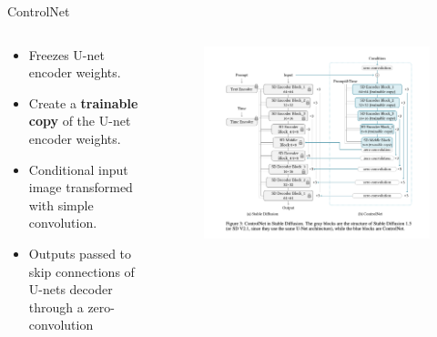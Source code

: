 \documentclass[8pt]{beamer}
\begin{document}
\begin{frame}{ControlNet}
    \begin{columns}
        \begin{column}{0.5\textwidth}
            \begin{itemize}
               \item Freezes U-net encoder weights.
               \item Create a \textbf{trainable copy} of the U-net encoder weights.
               \item Conditional input image transformed with simple convolution.
               \item Outputs passed to skip connections of U-nets decoder through a zero-convolution
            \end{itemize}
        \end{column}

        \begin{column}{0.5\textwidth}
            \begin{figure}
                \includegraphics[scale=0.23]{images/control_net_model_architecture}
                \label{fig:control_net_generated_images}
            \end{figure}
        \end{column}
    \end{columns}
\end{frame}
\end{document}
